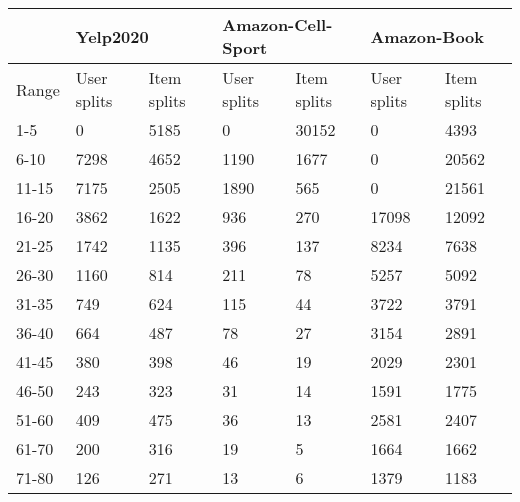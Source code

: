 \begin{table*}[]%
    \begin{tabular}{|l|l|l|l|l|l|l|}
    \hline
            & \multicolumn{2}{l|}{Yelp2020} & \multicolumn{2}{l|}{Amazon-Cell-Sport} & \multicolumn{2}{l|}{Amazon-Book} \\ \hline
    Range   & User splits   & Item splits   & User splits        & Item splits       & User splits     & Item splits    \\ \hline
    1-5     & 0             & 5185          & 0                  & 30152             & 0               & 4393           \\ \hline
    6-10    & 7298          & 4652          & 1190               & 1677              & 0               & 20562          \\ \hline
    11-15   & 7175          & 2505          & 1890               & 565               & 0               & 21561          \\ \hline
    16-20   & 3862          & 1622          & 936                & 270               & 17098           & 12092          \\ \hline
    21-25   & 1742          & 1135          & 396                & 137               & 8234            & 7638           \\ \hline
    26-30   & 1160          & 814           & 211                & 78                & 5257            & 5092           \\ \hline
    31-35   & 749           & 624           & 115                & 44                & 3722            & 3791           \\ \hline
    36-40   & 664           & 487           & 78                 & 27                & 3154            & 2891           \\ \hline
    41-45   & 380           & 398           & 46                 & 19                & 2029            & 2301           \\ \hline
    46-50   & 243           & 323           & 31                 & 14                & 1591            & 1775           \\ \hline
    51-60   & 409           & 475           & 36                 & 13                & 2581            & 2407           \\ \hline
    61-70   & 200           & 316           & 19                 & 5                 & 1664            & 1662           \\ \hline
    71-80   & 126           & 271           & 13                 & 6                 & 1379            & 1183           \\ \hline

\end{tabular}
\end{table*}
